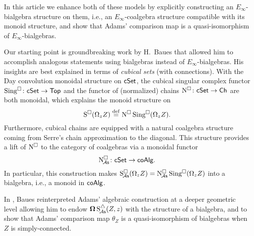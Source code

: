 In this article we enhance both of these models by explicitly constructing an $E_\infty$-bialgebra structure on them, i.e., an $E_\infty$-coalgebra structure compatible with its monoid structure, and show that Adams' comparison map is a quasi-isomorphism of $E_\infty$-bialgebras.

Our starting point is groundbreaking work by H.~Baues that allowed him to accomplish analogous statements using bialgebras instead of $E_\infty$-bialgebras.
His insights are best explained in terms of \textit{cubical sets} (with connections).
With the Day convolution monoidal structure on $\mathsf{cSet}$, the cubical singular complex functor $\operatorname{Sing^{\square}} \colon \mathsf{cSet} \to \mathsf{Top}$ and the functor of (normalized) chains $\operatorname{N^{\square}} \colon \mathsf{cSet} \to \mathsf{Ch}$ are both monoidal, which explains the monoid structure on
\[
\operatorname{S^{\square}}(\Omega_z Z) \stackrel{\mathrm{def}}{=} \operatorname{N^{\square}} \operatorname{Sing^{\square}}(\Omega_z Z).
\]
Furthermore, cubical chains are equipped with a natural coalgebra structure coming from Serre's chain approximation to the diagonal.
This structure provides a lift of $\operatorname{N^{\square}}$ to the category of coalgebras via a monoidal functor
\[
\operatorname{N^{\square}_{\!{\mathcal{A}\mathsf{s}}}} \colon \mathsf{cSet} \to \mathsf{coAlg}.
\]
In particular, this construction makes $\operatorname{S^{\square}_{\!{\mathcal{A}\mathsf{s}}}}(\Omega_z Z) = \operatorname{N^{\square}_{\!{\mathcal{A}\mathsf{s}}}}\operatorname{Sing^{\square}}(\Omega_z Z)$ into a bialgebra, i.e., a monoid in $\mathsf{coAlg}$.

In \cite{baues1998hopf}, Baues reinterpreted Adams' algebraic construction at a deeper geometric level allowing him to endow $\operatorname{\mathbf{\Omega}} \operatorname{S^{\triangle}_{\!{\mathcal{A}\mathsf{s}}}}(Z,z)$ with the structure of a bialgebra, and to show that Adams' comparison map $\theta_Z$ is a quasi-isomorphism of bialgebras when $Z$ is simply-connected.

